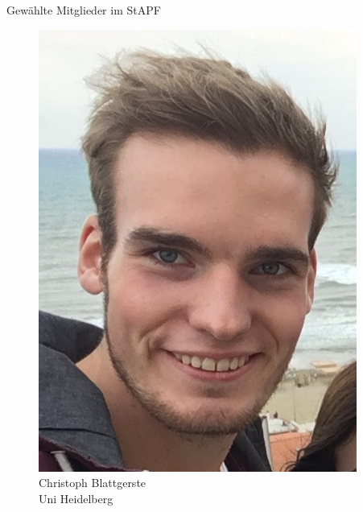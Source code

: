 \documentclass[compress, aspectratio=169]{beamer}
\begin{document}
\begin{frame}{Gewählte Mitglieder im StAPF}
\begin{minipage}{.28\textwidth}
    \begin{figure}
      \begin{minipage}[c]{.5\textwidth}
        \includegraphics[height=0.35\textheight]{chris.jpeg}
      \end{minipage} \hfill
      \begin{minipage}[c]{.47\textwidth}
        \caption*{Christoph Blattgerste\\Uni Heidelberg}
      \end{minipage}
    \end{figure}
  \end{minipage}
  \hfill
  \begin{minipage}{.28\textwidth}
    \begin{figure}
      \begin{minipage}[r]{.57\textwidth}

\end{minipage}
\end{figure}
\end{minipage}
\end{frame}
\end{document}
